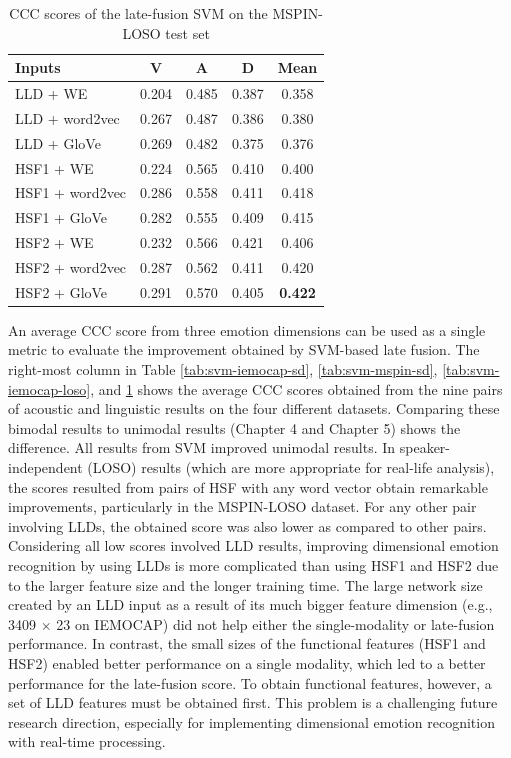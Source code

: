 \begin{table}[htbp]
\caption{CCC scores of the late-fusion SVM on the MSPIN-LOSO test set}
\begin{center}
 \label{tab:svm-mspin-loso}
 \begin{tabular}{l c c c c}
 \hline 
Inputs & V & A & D & Mean \\
 \hline
LLD    + WE        & 0.204 & 0.485 & 0.387 & 0.358 \\
LLD    + word2vec  & 0.267 & 0.487 & 0.386 & 0.380 \\
LLD    + GloVe     & 0.269 & 0.482 & 0.375 & 0.376 \\
HSF1   + WE        & 0.224 & 0.565 & 0.410 & 0.400 \\
HSF1   + word2vec  & 0.286 & 0.558 & 0.411 & 0.418 \\
HSF1   + GloVe     & 0.282 & 0.555 & 0.409 & 0.415 \\
HSF2   + WE        & 0.232 & 0.566 & 0.421 & 0.406 \\
HSF2   + word2vec  & 0.287 & 0.562 & 0.411 & 0.420 \\
HSF2   + GloVe     & 0.291 & 0.570 & 0.405 & \textbf{0.422} \\ 
 \hline
\end{tabular}
\end{center}
\end{table} 


An average CCC score from three emotion dimensions can be used as a single
metric to evaluate the improvement obtained by SVM-based late fusion. The
right-most column in Table \ref{tab:svm-iemocap-sd}, \ref{tab:svm-mspin-sd},
\ref{tab:svm-iemocap-loso}, and \ref{tab:svm-mspin-loso} shows the average CCC
scores obtained from the nine pairs of acoustic and linguistic results on the
four different datasets.  Comparing these bimodal results to unimodal results
(Chapter 4 and Chapter 5) shows the difference. All results from SVM improved
unimodal results. In speaker-independent (LOSO) results (which are more
appropriate for real-life analysis), the scores resulted from pairs of HSF with
any word vector obtain remarkable improvements, particularly in the MSPIN-LOSO
dataset.  For any other pair involving LLDs, the obtained score was also lower
as compared to other pairs.  Considering all low scores involved LLD results,
improving dimensional emotion recognition by using LLDs is more complicated
than using HSF1 and HSF2 due to the larger feature size and the longer training
time. The large network size created by an LLD input as a result of its much
bigger feature dimension (e.g., 3409 $\times$ 23 on IEMOCAP) did not help
either the single-modality or late-fusion performance.  In contrast, the small
sizes of the functional features (HSF1 and HSF2) enabled better performance on
a single modality, which led to a better performance for the late-fusion score.
To obtain functional features, however, a set of LLD features must be obtained
first. This problem is a challenging future research direction, especially for
implementing dimensional emotion recognition with real-time processing. 

